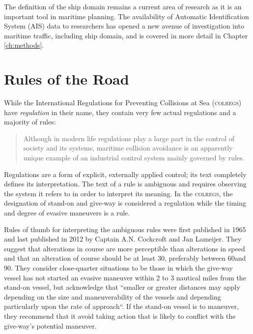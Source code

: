 \documentclass[twoside,symmetric,notoc]{tufte-book}
\begin{document}
\par{%
The definition of the ship domain remains a current area of research as it is an important tool in maritime planning. The availability of Automatic Identification System (AIS) data to researchers has opened a new avenue of investigation into maritime traffic, including ship domain, and is covered in more detail in Chapter \ref{ch:methods}. 
}


\section{Rules of the Road}
\par{%
While the International Regulations for Preventing Collisions at Sea (\textsc{colregs}) have \textit{regulation} in their name, they contain very few actual regulations and a majority of rules:
\begin{quotation}
Although in modern life regulations play a large part in the control of society and its systems, maritime collision avoidance is an apparently unique example of an industrial control system mainly governed by rules.\cite{Taylor_1988}
\end{quotation}
Regulations are a form of explicit, externally applied control; its text completely defines its interpretation. The text of a rule is ambiguous and requires observing the system it refers to in order to interpret its meaning. In the \textsc{colregs}, the designation of stand-on and give-way is considered a regulation while the timing and degree of evasive maneuvers is a rule. 
}
\par{%
Rules of thumb for interpreting the ambiguous rules were first published in 1965 and last published in 2012 by Captain A.N. Cockcroft and Jan Lameijer.\cite{Cockcroft} They suggest that alterations in course are more perceptible than alterations in speed and that an alteration of course should be at least 30\textdegree, preferably between 60\textdegree and 90\textdegree. They consider close-quarter situations to be those in which the give-way vessel has not started an evasive maneuver within 2 to 3 nautical miles from the stand-on vessel, but acknowledge that ``smaller or greater distances may apply depending on the size and maneuverability of the vessels and depending particularly upon the rate of approach``. If the stand-on vessel is to maneuver, they recommend that it avoid taking action that is likely to conflict with the give-way's potential maneuver.
}
\end{document}
